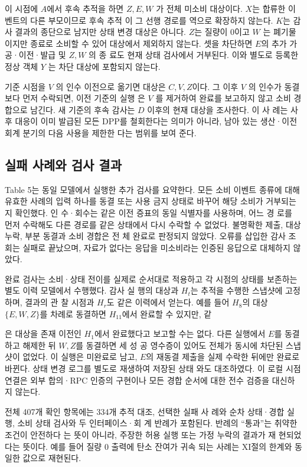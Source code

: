 이 시점에 \(A\)에서 후속 추적을 하면 \(Z,E,W\) 가 전체 미소비
대상이다. \(X\)는 합류한 이벤트의 다른 부모이므로 후속 추적
이 그 선행 경로를 역으로 확장하지 않는다. \(K\)는 감사 결과의
종단으로 남지만 상태 변경 대상은 아니다. \(Z\)는 질량이 0이고
\(W\) 는 폐기물이지만 종료로 소비할 수 있어 대상에서 제외하지
않는다. 셋을 차단하면 \(E\)의 추가 가공·이전·발급 및 \(Z,W\) 의 종
료도 현재 상태 검사에서 거부된다. 이와 별도로 등록한 정상
객체 \(Y\) 는 차단 대상에 포함되지 않는다.

기준 시점을 \(V\) 의 인수 이전으로 옮기면 대상은 \(C,V,Z\)이다.
그 이후 \(V\) 의 인수가 동결보다 먼저 수락되면, 이전 기준의 실행
은 \(V\) 를 제거하여 완료를 보고하지 않고 소비 경합으로 남긴다.
새 기준의 후속 감사는 \(D\) 이후의 현재 대상을 조사한다. 이 사
례는 사후 대응이 이미 발급된 모든 DPP를 철회한다는 의미가
아니라, 남아 있는 생산·이전 회계 분기의 다음 사용을 제한한
다는 범위를 보여 준다.

\subsection{실패 사례와 검사 결과}
Table 5는 동일 모델에서 실행한 추가 검사를 요약한다. 모든
소비 이벤트 종류에 대해 유효한 사례의 입력 하나를 동결 또는
사용 금지 상태로 바꾸어 해당 소비가 거부되는지 확인했다. 인
수·회수는 같은 이전 증표의 동일 식별자를 사용하며, 어느 경
로를 먼저 수락해도 다른 경로를 같은 상태에서 다시 수락할 수
없었다. 불명확한 제출, 대상 누락, 부분 동결과 소비 경합은 전
체 완료로 판정되지 않았다. 오류를 삽입한 감사 조회는 실패로
끝났으며, 자료가 없다는 응답을 미소비라는 인증된 응답으로
대체하지 않았다.

완료 검사는 소비·상태 전이를 실제로 순서대로 적용하고 각
시점의 상태를 보존하는 별도 이력 모델에서 수행했다. 감사 실
행의 대상과 \(H_{t}\)는 추적을 수행한 스냅샷에 고정하며, 결과의 관
찰 시점과 \(H_{r}\)도 같은 이력에서 얻는다. 예를 들어 \(H_{8}\)의 대상
\(\{E,W,Z\}\)를 차례로 동결하면 \(H_{11}\)에서 완료할 수 있지만, 같

은 대상을 존재 이전인 \(H_{1}\)에서 완료했다고 보고할 수는 없다.
다른 실행에서 \(E\)를 동결하고 해제한 뒤 \(W,Z\)를 동결하면 세 성
공 영수증이 있어도 전체가 동시에 차단된 스냅샷이 없었다. 이
실행은 미완료로 남고, \(E\)의 재동결 제출을 실제 수락한 뒤에만
완료로 바뀐다. 상태 변경 로그를 별도로 재생하여 저장된 상태
와도 대조하였다. 이 로컬 시점 연결은 외부 합의·RPC 인증의
구현이나 모든 경합 순서에 대한 전수 검증을 대신하지 않는다.

전체 407개 확인 항목에는 334개 추적 대조, 선택한 실패 사
례와 순차 상태·경합 실행, 소비 상태 검사와 두 인터페이스·회
계 반례가 포함된다. 반례의 “통과”는 취약한 조건이 안전하다
는 뜻이 아니라, 주장한 허용 실행 또는 가정 누락의 결과가 재
현되었다는 뜻이다. 예를 들어 질량 0 출력에 탄소 잔여가 귀속
되는 사례는 XI절의 한계와 동일한 값으로 재현된다.

